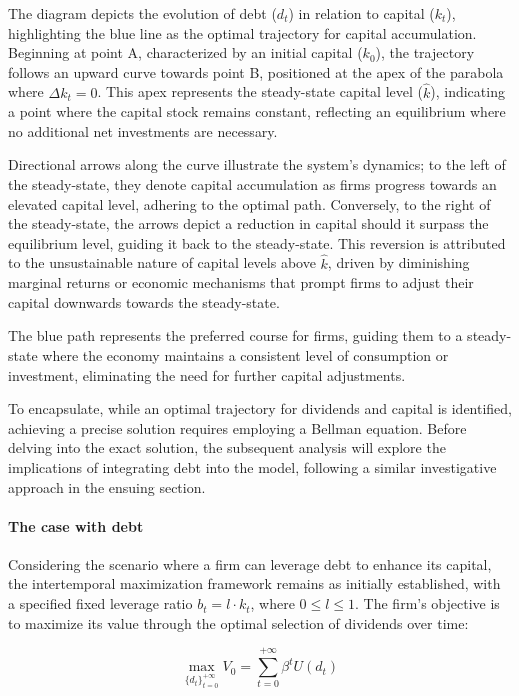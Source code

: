 \documentclass[12pt]{article}
\begin{document}
The diagram depicts the evolution of debt (\(d_t\)) in relation to capital (\(k_t\)), highlighting the blue line as the
optimal trajectory for capital accumulation. Beginning at point A, characterized by an initial capital (\(k_0\)), the
trajectory follows an upward curve towards point B,  positioned at the apex of the parabola where \(\Delta k_t = 0\).
This apex represents the steady-state capital level (\(\hat{k}\)), indicating a point where the capital stock remains
constant, reflecting an equilibrium where no additional net investments are necessary.

Directional arrows along the curve illustrate the system's dynamics; to the left of the steady-state, they denote
capital accumulation as firms progress towards an elevated capital level, adhering to the optimal path. Conversely, to
the right of the steady-state, the arrows depict a  reduction in capital should it surpass the equilibrium level,
guiding it back to the steady-state. This reversion is attributed to the unsustainable nature of capital levels above
\(\hat{k}\), driven by diminishing marginal returns or economic mechanisms that prompt firms to adjust their capital
downwards towards the steady-state.

The blue path represents the preferred course for firms, guiding them to a steady-state where the economy maintains a
consistent level of consumption or investment, eliminating the need for further capital  adjustments.

To encapsulate, while an optimal trajectory for dividends and capital is identified, achieving a precise solution
requires employing a Bellman equation. Before delving into the exact solution, the subsequent analysis will explore the
implications of integrating debt into the model,  following a similar investigative approach in the ensuing section.

\paragraph{The case with debt}
Considering the scenario where a firm can leverage debt to enhance its capital, the intertemporal maximization framework
remains  as initially established, with a specified fixed leverage ratio \(b_t = l \cdot k_t\), where \(0 \leq l \leq
1\). The firm's objective is to maximize its value through the optimal selection of dividends over time:

\[
\max_{{\{d_{t}\}}_{t=0}^{+\infty}}V_0 = \sum_{t=0}^{+\infty}{\beta^t U(d_t)}
\]
\end{document}
